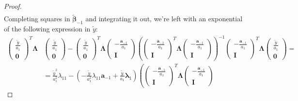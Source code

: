 \documentclass[10pt,fleqn]{amsart}
\theoremstyle{definition}
\theoremstyle{remark}
\numberwithin{equation}{section}
\newcommand{\aaa}{\boldsymbol{a}}
\newcommand{\bbeta}{\boldsymbol{\beta}}
\newcommand{\llambda}{\boldsymbol{\lambda}}
\newcommand{\LLambda}{\boldsymbol{\Lambda}}
\newcommand{\bbetatilde}{\widetilde{\bbeta}}
\newcommand{\ytilde}{\widetilde{y}}
\begin{document}
\begin{proof}
\begin{equation*}
\begin{split}
\end{split}\end{equation*}
Completing squares in $\bbetatilde_{-1}$ and integrating it out, we're left with an exponential of the following expression in $\ytilde$:
\begin{equation}\label{appendix_gauss_conv_eq}\begin{split}
    \left(\begin{matrix}\frac \ytilde{a_1}\\\boldsymbol{0}\end{matrix}\right)^T
    \LLambda&
    \left(\begin{matrix}\frac \ytilde{a_1}\\\boldsymbol{0}\end{matrix}\right)-
    \left(\begin{matrix}\frac \ytilde{a_1}\\\boldsymbol{0}\end{matrix}\right)^T
    \LLambda
    \left(\begin{matrix}-\frac {\aaa_{-1}}{a_1}\\\boldsymbol{I}\end{matrix}\right)
    \left(
        \left(\begin{matrix}-\frac {\aaa_{-1}}{a_1}\\\boldsymbol{I}\end{matrix}\right)^T
        \LLambda
        \left(\begin{matrix}-\frac {\aaa_{-1}}{a_1}\\\boldsymbol{I}\end{matrix}\right)
    \right)^{-1}
    \left(\begin{matrix}-\frac {\aaa_{-1}}{a_1}\\\boldsymbol{I}\end{matrix}\right)^T
    \LLambda
    \left(\begin{matrix}\frac \ytilde{a_1}\\\boldsymbol{0}\end{matrix}\right)=\\
    &=\frac{\ytilde^2}{a_1^2}\lambda_{11}-\left(-\frac{\ytilde}{a_1^2}\lambda_{11}\aaa_{-1}+\frac{\ytilde}{a_1}\llambda_1\right)
    \left(
        \left(\begin{matrix}-\frac {\aaa_{-1}}{a_1}\\\boldsymbol{I}\end{matrix}\right)^T
        \LLambda
        \left(\begin{matrix}-\frac {\aaa_{-1}}{a_1}\\\boldsymbol{I}\end{matrix}\right)

\end{split}
\end{equation}
\end{proof}
\end{document}
